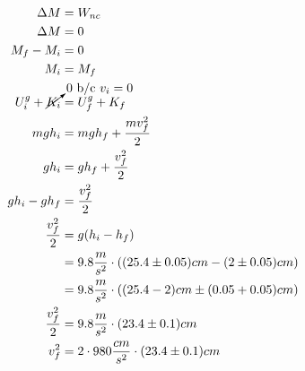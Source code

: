 \documentclass{article}
\begin{document}
\begin{align*}
    \Delta M                                       & = W_{nc}                                                                                                \\
    \Delta M                                       & = 0                                                                                                     \\
    M_f - M_i                                      & = 0                                                                                                     \\
    M_i                                            & = M_f                                                                                                   \\
    U^g_i + \cancelto{0 \text{ b/c } v_i = 0}{K_i} & = U^g_f + K_f                                                                                           \\
    mgh_i                                          & = mgh_f + \frac{mv_f^2}{2}                                                                              \\
    gh_i                                           & = gh_f + \frac{v_f^2}{2}                                                                                \\
    gh_i - gh_f                                    & = \frac{v_f^2}{2}                                                                                       \\
    \frac{v_f^2}{2}                                & = g(h_i - h_f)                                                                                          \\
                                                   & = 9.8 \frac{m}{s^2} \cdot \left( (25.4 \pm 0.05)cm - (2 \pm 0.05)cm \right)                             \\
                                                   & = 9.8 \frac{m}{s^2} \cdot \left( (25.4 - 2)cm \pm (0.05 + 0.05)cm \right)                               \\
    \frac{v_f^2}{2}                                & = 9.8 \frac{m}{s^2} \cdot (23.4 \pm 0.1)cm                                                              \\
    v_f^2                                          & = 2 \cdot 980 \frac{cm}{s^2} \cdot (23.4 \pm 0.1)cm                                                     \\

\end{align*}
\end{document}
